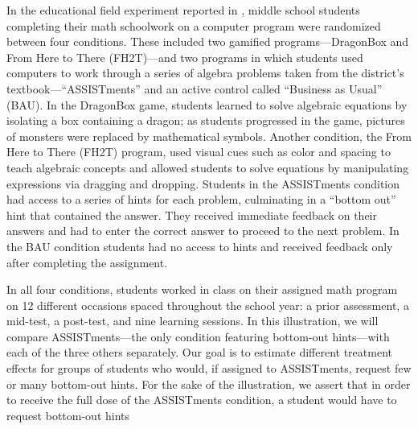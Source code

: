 \documentclass[]{article}
\begin{document}
In the educational field experiment reported in \citet{impactPaper}, middle school students completing their math schoolwork on a computer program were randomized between four conditions.
These included two gamified programs---DragonBox and From Here to There (FH2T)---and two programs in which students used computers to work through a series of algebra problems taken from the district's textbook---``ASSISTments'' and an active control called ``Business as Usual'' (BAU).  %
In the DragonBox game, students learned to solve algebraic equations by isolating a box containing a dragon; as students progressed in the game, pictures of monsters were replaced by mathematical symbols.
Another condition, the From Here to There (FH2T) program, used visual cues such as color and spacing to teach algebraic concepts and allowed students to solve equations by manipulating expressions via dragging and dropping.
Students in the ASSISTments condition had access to a series of hints for each problem, culminating in a ``bottom out'' hint that contained the answer. They received immediate feedback on their answers and had to enter the correct answer to proceed to the next problem.
In the BAU condition students had no access to hints and received feedback only after completing the assignment.

In all four conditions, students worked in class on their assigned math program on 12 different occasions spaced throughout the school year: a prior assessment, a mid-test, a post-test, and nine learning sessions.
In this illustration, we will compare ASSISTments---the only condition featuring bottom-out hints---with each of the three others separately. Our goal is to estimate different treatment effects for groups of students who would, if assigned to ASSISTments, request few or many bottom-out hints.
For the sake of the illustration, we assert that in order to receive the full dose of the ASSISTments condition, a student would have to request bottom-out hints
\end{document}
